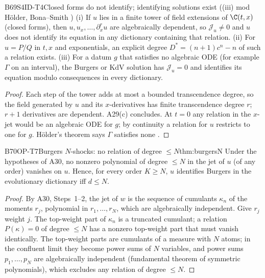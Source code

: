 \begin{dimcard}{B69}{S4ID-T4}{Closed forms do not identify; identifying solutions exist}{\pw{} ((iii) mod H\"older, Bona--Smith \cf)}{}
(i) If $u$ lies in a finite tower of field extensions of $\C(t,x)$ (closed forms), then $u,u_x,\dots,\partial_x^ru$ are algebraically dependent, so $\mathcal J_u\ne0$ and $u$ does not identify its equation in any dictionary containing that relation. (ii) For $u=P/Q$ in $t,x$ and exponentials, an explicit degree $D^*=(n+1)c^n-n$ of such a relation exists. (iii) For a datum $g$ that satisfies no algebraic ODE (for example $\Gamma$ on an interval), the Burgers or KdV solution has $\mathcal J_u=0$ and identifies its equation modulo consequences in every dictionary.
\end{dimcard}
\begin{proof}
Each step of the tower adds at most a bounded transcendence degree, so the field generated by $u$ and its $x$-derivatives has finite transcendence degree $r$; $r+1$ derivatives are dependent. A29(c) concludes.
At $t=0$ any relation in the $x$-jet would be an algebraic ODE for $g$; by continuity a relation for $u$ restricts to one for $g$. H\"older's theorem says $\Gamma$ satisfies none \cf.
\end{proof}

\begin{dimcard}{B70}{OP-T7}{Burgers $N$-shocks: no relation of degree $\le N$}{\proved}{thm:burgersN}
\label{dim:S4ID-K1}%
Under the hypotheses of A30, no nonzero polynomial of degree $\le N$ in the jet of $u$ (of any order) vanishes on $u$. Hence, for every order $K\ge N$, $u$ identifies Burgers in the evolutionary dictionary iff $d\le N$.
\end{dimcard}
\begin{proof}
By A30, Steps~1--2, the jet of $w$ is the sequence of cumulants $\kappa_n$ of the moments $r_j$, polynomial in $r_1,\dots,r_N$, which are algebraically independent.
Give $r_j$ weight $j$. The top-weight part of $\kappa_n$ is a truncated cumulant; a relation $P(\kappa)=0$ of degree $\le N$ has a nonzero top-weight part that must vanish identically.
The top-weight parts are cumulants of a measure with $N$ atoms; in the confluent limit they become power sums of $N$ variables, and power sums $p_1,\dots,p_N$ are algebraically independent (fundamental theorem of symmetric polynomials), which excludes any relation of degree $\le N$.
\end{proof}

